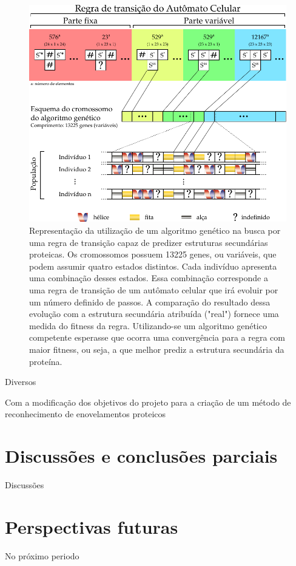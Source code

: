 \begin{figure}[h]
	\includegraphics[width=1\linewidth]{ca_ga_final}
	\caption{Representação da utilização de um algoritmo genético na busca por uma regra de transição capaz de predizer estruturas secundárias proteicas. Os cromossomos possuem 13225 genes, ou variáveis, que podem assumir quatro estados distintos. Cada indivíduo apresenta uma combinação desses estados. Essa combinação corresponde a uma regra de transição de um autômato celular que irá evoluir por um número definido de passos. A comparação do resultado dessa evolução com a estrutura secundária atribuída ("real") fornece uma medida do fitness da regra. Utilizando-se um algoritmo genético competente esperasse que ocorra uma convergência para a regra com maior fitness, ou seja, a que melhor prediz a estrutura secundária da proteína.}
		\label{fig:ca_ga}
\end{figure}

Diversos 



Com a modificação dos objetivos do projeto para a criação de um método de reconhecimento de enovelamentos proteicos
\section{Discussões e conclusões parciais}
Discussões 
\section{Perspectivas futuras}
No próximo periodo
